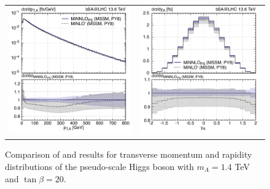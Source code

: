 \documentclass[11pt,a4paper]{article}
\begin{document}
\begin{figure}[t!]
\begin{center}
\begin{tabular}{cc}
\includegraphics[width=.45\textwidth, page=1]{plots/5fs/BSM/pt_Higgs__A-1400GeV-PY8-kQ0.pdf}&
\includegraphics[width=.45\textwidth, page=1]{plots/5fs/BSM/y_Higgs__A-1400GeV-PY8-kQ0.pdf}
\end{tabular}
\vspace*{1ex}
\caption{Comparison of \minlo{} and \minnlo{} results for transverse momentum and rapidity distributions of the pseudo-scale Higgs boson with $m_A=1.4$ TeV and $\tan\beta=20$. \label{fig:MiNLOBSM}}
\end{center}
\end{figure}
\end{document}
